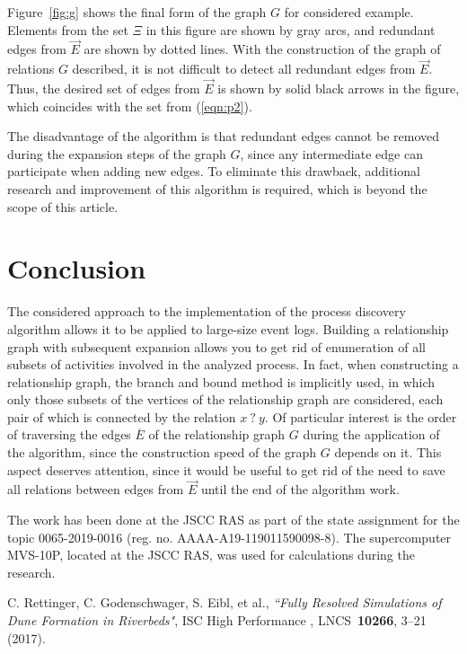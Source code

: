 \documentclass[
11pt,%
tightenlines,%
twoside,%
onecolumn,%
nofloats,%
nobibnotes,%
nofootinbib,%
superscriptaddress,%
noshowpacs,%
centertags]%
{revtex4}
\begin{document}
Figure~\ref{fig:g} shows the final form of the graph $G$ for considered example.
Elements from the set $\Xi$ in this figure are shown by gray arcs, and redundant edges from $\overrightarrow{E}$ are shown by dotted lines.
With the construction of the graph of relations $G$ described, it is not difficult to detect all redundant edges from $\overrightarrow{E}$.
Thus, the desired set of edges from $\overrightarrow{E}$ is shown by solid black arrows in the figure, which coincides with the set from (\ref{eqn:p2}).

The disadvantage of the algorithm is that redundant edges cannot be removed during the expansion steps of the graph $G$, since any intermediate edge can participate when adding new edges.
To eliminate this drawback, additional research and improvement of this algorithm is required, which is beyond the scope of this article.

\section{Conclusion}

The considered approach to the implementation of the process discovery algorithm allows it to be applied to large-size event logs.
Building a relationship graph with subsequent expansion allows you to get rid of enumeration of all subsets of activities involved in the analyzed process.
In fact, when constructing a relationship graph, the branch and bound method is implicitly used, in which only those subsets of the vertices of the relationship graph are considered, each pair of which is connected by the relation $x \ ? \ y$.
Of particular interest is the order of traversing the edges $\overline{E}$ of the relationship graph $G$ during the application of the algorithm, since the construction speed of the graph $G$ depends on it.
This aspect deserves attention, since it would be useful to get rid of the need to save all relations between edges from $\overrightarrow{E}$ until the end of the algorithm work.

\begin{acknowledgments}
The work has been done at the JSCC RAS as part of the state assignment for the topic 0065-2019-0016 (reg. no. AAAA-A19-119011590098-8). The supercomputer MVS-10P, located at the JSCC RAS, was used for calculations during the research.
\end{acknowledgments}

\begin{thebibliography}{99}

C. Rettinger, C. Godenschwager, S. Eibl, et al., {\it ``Fully Resolved Simulations of Dune Formation in Riverbeds"}, ISC High Performance , LNCS~{\bf 10266}, 3--21 (2017).

\end{thebibliography}
\end{document}
